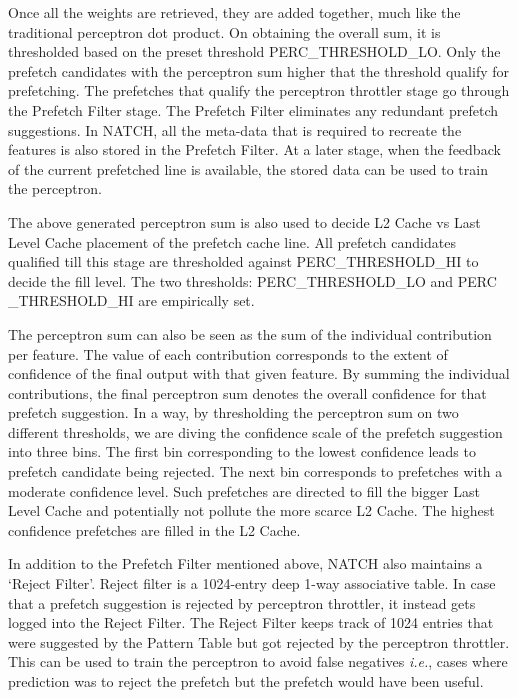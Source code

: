 Once all the weights are retrieved, they are added together, much like
the traditional perceptron dot product.  On obtaining the overall sum,
it is thresholded based on the preset threshold PERC\_THRESHOLD\_LO.
Only the prefetch candidates with the perceptron sum higher that the
threshold qualify for prefetching.  The prefetches that qualify the
perceptron throttler stage go through the Prefetch Filter stage.  
The Prefetch Filter eliminates any redundant
prefetch suggestions.  In NATCH, all the meta-data that is required
to recreate the features is also stored in the Prefetch Filter.  At a
later stage, when the feedback of the current prefetched line is
available, the stored data can be used to train the perceptron.

The above generated perceptron sum is also used to decide L2 Cache vs
Last Level Cache placement of the prefetch cache line.  All prefetch
candidates qualified till this stage are thresholded against
PERC\_THRESHOLD\_HI to decide the fill level. The two thresholds:
PERC\_THRESHOLD\_LO and PERC \_THRESHOLD\_HI are empirically set.

The perceptron sum can also be seen as the sum of the individual
contribution per feature.  The value of each contribution corresponds
to the extent of confidence of the final output with that given
feature.  By summing the individual contributions, the final
perceptron sum denotes the overall confidence for that prefetch
suggestion.  In a way, by thresholding the perceptron sum on two
different thresholds, we are diving the confidence scale of the
prefetch suggestion into three bins.  The first bin corresponding to
the lowest confidence leads to prefetch candidate being rejected.  The
next bin corresponds to prefetches with a moderate confidence level.
Such prefetches are directed to fill the bigger Last Level Cache and
potentially not pollute the more scarce L2 Cache.  The highest
confidence prefetches are filled in the L2 Cache.

In addition to the Prefetch Filter mentioned above, NATCH also
maintains a `Reject Filter'.  Reject filter is a 1024-entry deep 1-way
associative table.  In case that a prefetch suggestion is rejected by
perceptron throttler, it instead gets logged into the Reject Filter.
The Reject Filter keeps track of 1024 entries that were suggested by
the Pattern Table but got rejected by the perceptron throttler.  This
can be used to train the perceptron to avoid false negatives
\textit{i.e.}, cases where prediction was to reject the prefetch but
the prefetch would have been useful.

